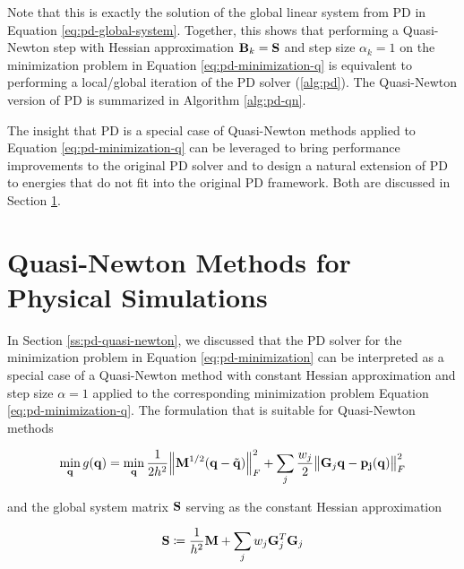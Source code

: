 \noindent Note that this is exactly the solution of the global linear system from PD in Equation \ref{eq:pd-global-system}. Together, this shows 
that performing a Quasi-Newton step with Hessian approximation $\mathbf{B}_k = \mathbf{S}$ and step size $\alpha_k = 1$ on the 
minimization problem in Equation \ref{eq:pd-minimization-q} is equivalent to performing a local/global iteration of the PD solver 
(\cref{alg:pd}). The Quasi-Newton version of PD is summarized in Algorithm \ref{alg:pd-qn}.

The insight that PD is a special case of Quasi-Newton methods applied to Equation \ref{eq:pd-minimization-q} can be leveraged to
bring performance improvements to the original PD solver and to design a natural extension of PD to energies that do not fit 
into the original PD framework. Both are discussed in Section \ref{s:qn-rts}.

\section{Quasi-Newton Methods for Physical Simulations}\label{s:qn-rts}
In Section \ref{ss:pd-quasi-newton}, we discussed that the PD solver for the minimization problem in Equation \ref{eq:pd-minimization}
can be interpreted as a special case of a Quasi-Newton method with constant Hessian approximation and step size $\alpha = 1$
applied to the corresponding minimization problem Equation \ref{eq:pd-minimization-q}. The formulation that is suitable for Quasi-Newton
methods

\begin{equation}\label{eq:pd-minimization-q2}
    \min_{\mathbf{q}} g(\mathbf{q}) = 
    \min_{\mathbf{q}} \frac{1}{2h^2} \norm{\mathbf{M}^{1/2}(\mathbf{q} - \tilde{\mathbf{q}})}^2_F + \sum_j \frac{w_j}{2} \norm{\mathbf{G}_j\mathbf{q}
    - \mathbf{p_j}(\mathbf{q})}^2_F
\end{equation}

\noindent and the global system matrix $\mathbf{S}$ serving as the constant Hessian approximation

\begin{equation}\label{eq:global-matrix}
    \mathbf{S} \coloneqq \frac{1}{h^2}\mathbf{M} + \sum_j w_j \mathbf{G}_j^T \mathbf{G}_j  
\end{equation}

